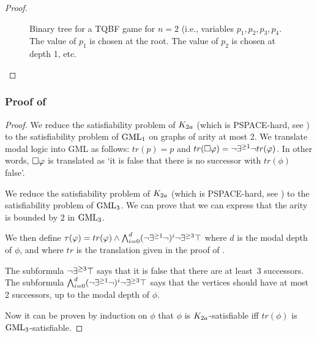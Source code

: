 \begin{proof}
\begin{figure*}[ht]
		\caption{Binary tree for a TQBF game for $n=2$ (i.e., variables $p_1, p_2, p_3, p_4$. The value of $p_1$ is chosen at the root. The value of $p_2$ is chosen at depth 1, etc.}
		\label{fig:binarytreeforTQBF}
	\end{figure*}
	
\end{proof}


\subsubsection{Proof of }



\begin{proof}
We reduce the satisfiability problem of $K_{2a}$ (which is PSPACE-hard, see ) to the satisfiability problem of $\text{GML}_1$ on graphs of arity at most 2.
We translate modal logic into GML as follows: $tr(p) = p$ and $tr(\square \varphi) = \lnot \exists^{\geq 1} \lnot tr(\varphi)$. In other words, $\square \varphi$ is translated as `it is false that there is no successor with $tr(\phi)$ false'.


\fbox{$\fragmentGML$}
We reduce the satisfiability problem of $K_{2a}$ (which is PSPACE-hard, see ) to the satisfiability problem of $\fragmentGML$.
We can prove that  we can express that the arity is bounded by $2$ in $\fragmentGML$.

	We then define $\tau(\varphi) = tr(\varphi) \land \bigwedge_{i=0}^d (\lnot \exists^{\geq 1}\lnot )^i \lnot \exists^{\geq 3} \top$
    where $d$ is the modal depth of $\phi$, and where $tr$ is the translation given in the proof of . 
    
    The subformula $\lnot \exists^{\geq 3} \top$ says that it is false that there are at least~3 successors.
	The subformula $\bigwedge_{i=0}^d (\lnot \exists^{\geq 1}\lnot )^i \lnot \exists^{\geq 3} \top$ says that the vertices should have at most 2 successors, up to the modal depth of $\phi$.
	
	Now it can be proven by induction on $\phi$ that 
	$\phi$ is $K_{2a}$-satisfiable iff $tr(\phi)$ is $\fragmentGML$-satisfiable.
\end{proof}








